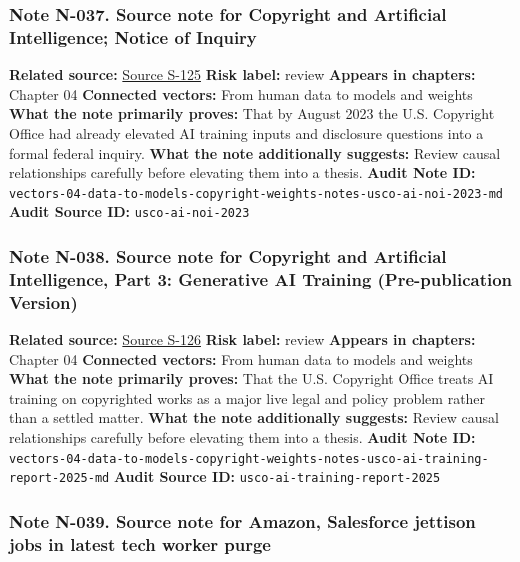 \documentclass[
  american,
  11pt,
  letterpaper,
]{article}
\begin{document}
\subsubsection{Note N-037. Source note for Copyright and Artificial
Intelligence; Notice of
Inquiry}\label{note-n-037-vectors-04-data-to-models-copyright-weights-notes-usco-ai-noi-2023-md}

\textbf{Related source:}
\hyperref[source-s-125-copyright-and-artificial-intelligence-notice-of-inquiry]{Source
S-125} \textbf{Risk label:} review \textbf{Appears in chapters:} Chapter
04 \textbf{Connected vectors:} From human data to models and weights
\textbf{What the note primarily proves:} That by August 2023 the U.S.
Copyright Office had already elevated AI training inputs and disclosure
questions into a formal federal inquiry. \textbf{What the note
additionally suggests:} Review causal relationships carefully before
elevating them into a thesis. \textbf{Audit Note ID:}
\texttt{vectors-04-data-to-models-copyright-weights-notes-usco-ai-noi-2023-md}
\textbf{Audit Source ID:} \texttt{usco-ai-noi-2023}

\subsubsection{Note N-038. Source note for Copyright and Artificial
Intelligence, Part 3: Generative AI Training (Pre-publication
Version)}\label{note-n-038-vectors-04-data-to-models-copyright-weights-notes-usco-ai-training-report-2025-md}

\textbf{Related source:}
\hyperref[source-s-126-copyright-and-artificial-intelligence-part-3-generative-ai-training-pre-publication-version]{Source
S-126} \textbf{Risk label:} review \textbf{Appears in chapters:} Chapter
04 \textbf{Connected vectors:} From human data to models and weights
\textbf{What the note primarily proves:} That the U.S. Copyright Office
treats AI training on copyrighted works as a major live legal and policy
problem rather than a settled matter. \textbf{What the note additionally
suggests:} Review causal relationships carefully before elevating them
into a thesis. \textbf{Audit Note ID:}
\texttt{vectors-04-data-to-models-copyright-weights-notes-usco-ai-training-report-2025-md}
\textbf{Audit Source ID:} \texttt{usco-ai-training-report-2025}

\subsubsection{Note N-039. Source note for Amazon, Salesforce jettison
jobs in latest tech worker
purge}\label{note-n-039-vectors-05-talent-hoarding-section174-layoffs-notes-ap-amazon-salesforce-tech-purge-2023-md}
\end{document}
